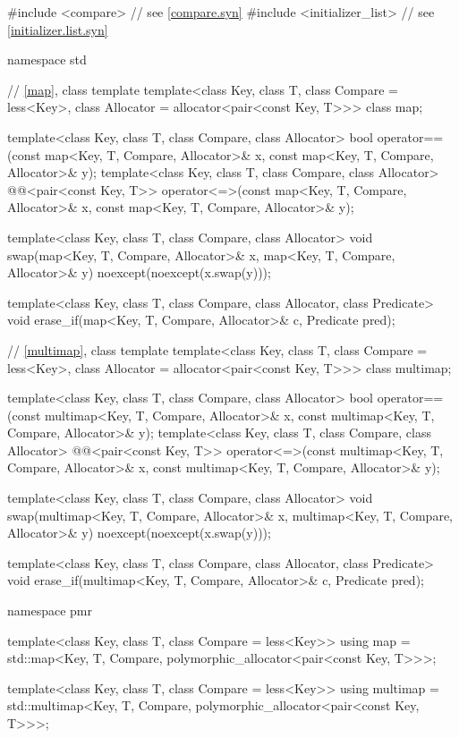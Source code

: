 %
\begin{codeblock}
#include <compare>              // see \ref{compare.syn}
#include <initializer_list>     // see \ref{initializer.list.syn}

namespace std {
  // \ref{map}, class template 
  template<class Key, class T, class Compare = less<Key>,
           class Allocator = allocator<pair<const Key, T>>>
    class map;

  template<class Key, class T, class Compare, class Allocator>
    bool operator==(const map<Key, T, Compare, Allocator>& x,
                    const map<Key, T, Compare, Allocator>& y);
  template<class Key, class T, class Compare, class Allocator>
    @@<pair<const Key, T>>
      operator<=>(const map<Key, T, Compare, Allocator>& x,
                  const map<Key, T, Compare, Allocator>& y);

  template<class Key, class T, class Compare, class Allocator>
    void swap(map<Key, T, Compare, Allocator>& x,
              map<Key, T, Compare, Allocator>& y)
      noexcept(noexcept(x.swap(y)));

  template<class Key, class T, class Compare, class Allocator, class Predicate>
    void erase_if(map<Key, T, Compare, Allocator>& c, Predicate pred);

  // \ref{multimap}, class template 
  template<class Key, class T, class Compare = less<Key>,
           class Allocator = allocator<pair<const Key, T>>>
    class multimap;

  template<class Key, class T, class Compare, class Allocator>
    bool operator==(const multimap<Key, T, Compare, Allocator>& x,
                    const multimap<Key, T, Compare, Allocator>& y);
  template<class Key, class T, class Compare, class Allocator>
    @@<pair<const Key, T>>
      operator<=>(const multimap<Key, T, Compare, Allocator>& x,
                  const multimap<Key, T, Compare, Allocator>& y);

  template<class Key, class T, class Compare, class Allocator>
    void swap(multimap<Key, T, Compare, Allocator>& x,
              multimap<Key, T, Compare, Allocator>& y)
      noexcept(noexcept(x.swap(y)));

  template<class Key, class T, class Compare, class Allocator, class Predicate>
    void erase_if(multimap<Key, T, Compare, Allocator>& c, Predicate pred);

  namespace pmr {
    template<class Key, class T, class Compare = less<Key>>
      using map = std::map<Key, T, Compare,
                           polymorphic_allocator<pair<const Key, T>>>;

    template<class Key, class T, class Compare = less<Key>>
      using multimap = std::multimap<Key, T, Compare,
                                     polymorphic_allocator<pair<const Key, T>>>;
  }
}
\end{codeblock}


